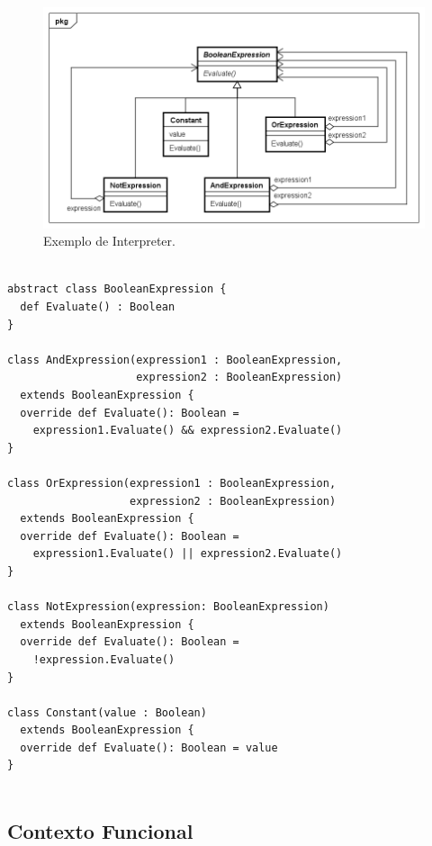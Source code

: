 \begin{figure}[htb]
	\caption{\label{interpreter_exemplo}Exemplo de Interpreter.}
	\begin{center}
	    \includegraphics[scale=0.5]{5_padroes-contexto-funcional/5.3_comportamentais/5.3.03_interpreter/Interpreter_exemplo.png}
	\end{center}
\end{figure}

\begin{lstlisting}[caption={Interpreter Orientação a Objetos.},label=oointerpreter]

abstract class BooleanExpression {
  def Evaluate() : Boolean
}

class AndExpression(expression1 : BooleanExpression,
                    expression2 : BooleanExpression)
  extends BooleanExpression {
  override def Evaluate(): Boolean =
    expression1.Evaluate() && expression2.Evaluate()
}

class OrExpression(expression1 : BooleanExpression,
                   expression2 : BooleanExpression)
  extends BooleanExpression {
  override def Evaluate(): Boolean =
    expression1.Evaluate() || expression2.Evaluate()
}

class NotExpression(expression: BooleanExpression)
  extends BooleanExpression {
  override def Evaluate(): Boolean =
    !expression.Evaluate()
}

class Constant(value : Boolean)
  extends BooleanExpression {
  override def Evaluate(): Boolean = value
}
    
\end{lstlisting}

\subsection*{Contexto Funcional}

